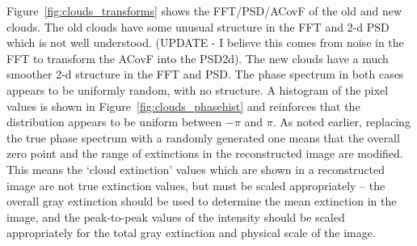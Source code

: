 \documentclass[11pt,preprint]{aastex}
\begin{document}
Figure~\ref{fig:clouds_transforms} shows the FFT/PSD/ACovF of the old and new clouds. The old clouds have some unusual structure in the FFT and 2-d PSD which is not well understood. (UPDATE - I believe this comes from noise in the FFT to transform the ACovF into the PSD2d). The new clouds have a much smoother 2-d structure in the FFT and PSD. The phase spectrum in both cases appears to be uniformly random, with no structure. A histogram of the pixel values is shown in Figure~\ref{fig:clouds_phasehist} and reinforces that the distribution appears to be uniform between $-\pi$ and $\pi$.  As noted earlier, replacing the true phase spectrum with a randomly generated one means that the overall zero point and the range of extinctions in the reconstructed image are modified. This means the `cloud extinction' values which are shown in a reconstructed image are not true extinction values, but must be scaled appropriately -- the overall gray extinction should be used to determine the mean extinction in the image, and the peak-to-peak values of the intensity should be scaled appropriately for the total gray extinction and physical scale of the image. 
\end{document}
